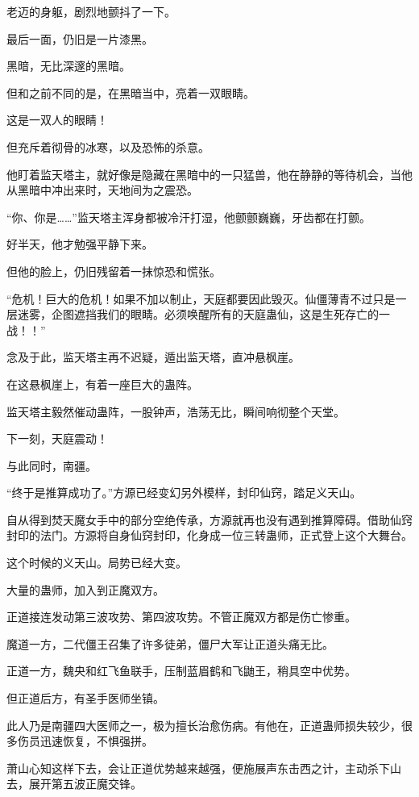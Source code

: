 \begin{this_body}
老迈的身躯，剧烈地颤抖了一下。

最后一面，仍旧是一片漆黑。

黑暗，无比深邃的黑暗。

但和之前不同的是，在黑暗当中，亮着一双眼睛。

这是一双人的眼睛！

但充斥着彻骨的冰寒，以及恐怖的杀意。

他盯着监天塔主，就好像是隐藏在黑暗中的一只猛兽，他在静静的等待机会，当他从黑暗中冲出来时，天地间为之震恐。

“你、你是……”监天塔主浑身都被冷汗打湿，他颤颤巍巍，牙齿都在打颤。

好半天，他才勉强平静下来。

但他的脸上，仍旧残留着一抹惊恐和慌张。

“危机！巨大的危机！如果不加以制止，天庭都要因此毁灭。仙僵薄青不过只是一层迷雾，企图遮挡我们的眼睛。必须唤醒所有的天庭蛊仙，这是生死存亡的一战！！”

念及于此，监天塔主再不迟疑，遁出监天塔，直冲悬枫崖。

在这悬枫崖上，有着一座巨大的蛊阵。

监天塔主毅然催动蛊阵，一股钟声，浩荡无比，瞬间响彻整个天堂。

下一刻，天庭震动！

与此同时，南疆。

“终于是推算成功了。”方源已经变幻另外模样，封印仙窍，踏足义天山。

自从得到焚天魔女手中的部分空绝传承，方源就再也没有遇到推算障碍。借助仙窍封印的法门。方源将自身仙窍封印，化身成一位三转蛊师，正式登上这个大舞台。

这个时候的义天山。局势已经大变。

大量的蛊师，加入到正魔双方。

正道接连发动第三波攻势、第四波攻势。不管正魔双方都是伤亡惨重。

魔道一方，二代僵王召集了许多徒弟，僵尸大军让正道头痛无比。

正道一方，魏央和红飞鱼联手，压制蓝眉鹤和飞鼬王，稍具空中优势。

但正道后方，有圣手医师坐镇。

此人乃是南疆四大医师之一，极为擅长治愈伤病。有他在，正道蛊师损失较少，很多伤员迅速恢复，不惧强拼。

萧山心知这样下去，会让正道优势越来越强，便施展声东击西之计，主动杀下山去，展开第五波正魔交锋。


\end{this_body}
